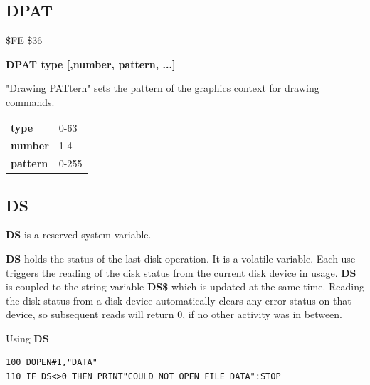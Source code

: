
\newpage
\subsection{DPAT}
\begin{description}[leftmargin=2cm,style=nextline]
\item [Token:] \$FE \$36
\item [Format:] {\bf DPAT type [,number, pattern, ...]}
\item [Usage:]
   "Drawing PATtern" sets the pattern
   of the graphics context for drawing commands.

\begin{center}
\ttfamily
\begin{tabular}{|l|l|}
\hline
   {\bf type}       &  0-63 \\
   {\bf number}     &  1-4 \\
   {\bf pattern}    &  0-255 \\
\hline
\end{tabular}
\end{center}
\end{description}


\newpage
\subsection{DS}
\begin{description}[leftmargin=2cm,style=nextline]
\item [Format:] {\bf DS} is a reserved system variable.
\item [Usage:]  {\bf DS} holds the status of the last disk operation.
                It is a volatile variable.
                Each use triggers the reading of the disk status
                from the current disk device in usage.
                {\bf DS} is coupled to the string variable {\bf DS\$}
                which is updated at the same time.
                Reading the disk status from a disk device automatically
                clears any error status on that device, so subsequent reads
                will return 0, if no other activity was in between.

\item [Example:] Using {\bf DS}
\begin{tcolorbox}[colback=black,coltext=white]
\verbatimfont{\codefont}
\begin{verbatim}
100 DOPEN#1,"DATA"
110 IF DS<>0 THEN PRINT"COULD NOT OPEN FILE DATA":STOP
\end{verbatim}
\end{tcolorbox}
\end{description}

